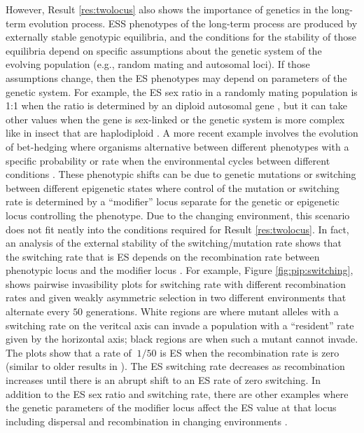 \documentclass[11pt]{article}
\begin{document}
However, Result \ref{res:twolocus} also shows the importance of genetics in the long-term evolution process. ESS phenotypes of the long-term process are produced by externally stable genotypic equilibria, and the conditions for the stability of those equilibria depend on specific assumptions about the genetic system of the evolving population (e.g., random mating and autosomal loci). If those assumptions change, then the ES phenotypes may depend on parameters of the genetic system. For example, the ES sex ratio \cite{Fisher:1930} in a randomly mating population is 1:1 when the ratio is determined by an diploid autosomal gene \cite{Hamilton:1967,Eshel:Feldman:1982}, but it can take other values when the gene is sex-linked or the genetic system is more complex like in insect that are haplodiploid \cite{Hamilton:1967,Eshel:Feldman:1982a}. A more recent example involves the evolution of bet-hedging where organisms alternative between different phenotypes with a specific probability or rate when the environmental cycles between different conditions \cite{Seger:Brockmann:1987,Slatkin:1974}. These phenotypic shifts can be due to genetic mutations \cite{Leigh:1970,Ishii:Matsuda:1989} or switching between different epigenetic states  \cite{Kussell:Leibler:2005,Salathe:VanCleve:2009} where control of the mutation or switching rate is determined by a ``modifier'' locus separate for the genetic or epigenetic locus controlling the phenotype. Due to the changing environment, this scenario does not fit neatly into the conditions required for Result \ref{res:twolocus}. In fact, an analysis of the external stability of the switching/mutation rate shows that the switching rate that is ES depends on the recombination rate between phenotypic locus and the modifier locus \cite{Liberman:VanCleve:2011}. For example, Figure \ref{fig:pip:switching}, shows pairwise invasibility plots for switching rate with different recombination rates and given weakly asymmetric selection in two different environments that alternate every $50$ generations. White regions are where mutant alleles with a switching rate on the veritcal axis can invade a population with a ``resident'' rate given by the horizontal axis; black regions are when such a mutant cannot invade. The plots show that a rate of $~1/50$ is ES when the recombination rate is zero (similar to older results in \cite{Leigh:1970,Lachmann:Jablonka:1996}). The ES switching rate decreases as recombination increases until there is an abrupt shift to an ES rate of zero switching. In addition to the ES sex ratio and switching rate, there are other examples where the genetic parameters of the modifier locus affect the ES value at that locus including dispersal and recombination in changing environments \cite{Carja:Liberman:2014}.
\end{document}
